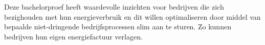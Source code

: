 
%
%
%
%
%

%



\chapter*{}

Deze bachelorproef heeft waardevolle inzichten voor bedrijven die zich bezighouden met hun energieverbruik en dit willen optimaliseren door middel van bepaalde niet-dringende bedrijfsprocessen slim aan te sturen. Zo kunnen bedrijven hun eigen energiefactuur verlagen.\\


